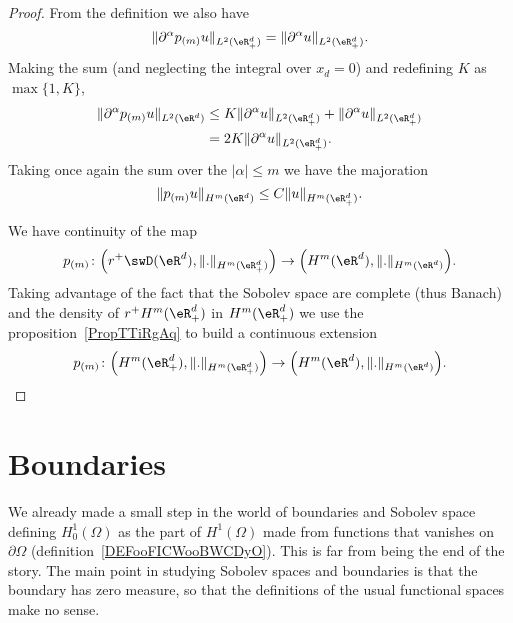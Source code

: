 \begin{proof}
    From the definition we also have
    \begin{equation}
        \| \partial^{\alpha}p_{(m)}u \|_{L^2(\eR^d_+)}=\| \partial^{\alpha}u \|_{L^2(\eR^d_+)}.
    \end{equation}
    Making the sum (and neglecting the integral over \( x_d=0\)) and redefining \(K \) as \( \max\{ 1,K \}\),
    \begin{subequations}
        \begin{align}
            \| \partial^{\alpha}p_{(m)}u \|_{L^2(\eR^d)}&\leq K \| \partial^{\alpha}u \|_{L^2(\eR^d_+)}+\| \partial^{\alpha}u \|_{L^2(\eR^d_+)}\\
            &=2K\| \partial^{\alpha}u \|_{L^2(\eR^d_+)}.
        \end{align}
    \end{subequations}
    Taking once again the sum over the \( | \alpha |\leq m\) we have the majoration
    \begin{equation}
        \| p_{(m)}u \|_{H^m(\eR^d)}\leq C \| u \|_{H^m(\eR^d_+)}.
    \end{equation}

    We have continuity of the map
    \begin{equation}
        p_{(m)}\colon \Big( r^+\swD(\eR^d),\| . \|_{H^m(\eR^d_+)} \Big)\to \Big( H^m(\eR^d),\| . \|_{H^m(\eR^d)} \Big).
    \end{equation}
    Taking advantage of the fact that the Sobolev space are complete (thus Banach) and the density of \( r^+H^m(\eR^d_+)   \) in \( H^m(\eR^d_+)\) we use the proposition~\ref{PropTTiRgAq} to build a continuous extension
    \begin{equation}
        p_{(m)}\colon \Big(  H^m(\eR^d_+)  ,\| . \|_{H^m(\eR^d_+)} \Big)\to \Big( H^m(\eR^d),\| . \|_{H^m(\eR^d)} \Big).
    \end{equation}
\end{proof}

\section{Boundaries}

We already made a small step in the world of boundaries and Sobolev space defining \( H_0^1(\Omega)\) as the part of \( H^1(\Omega)\) made from functions that vanishes on \( \partial\Omega\) (definition~\ref{DEFooFICWooBWCDyO}). This is far from being the end of the story. The main point in studying Sobolev spaces and boundaries is that the boundary has zero measure, so that the definitions of the usual functional spaces make no sense.

